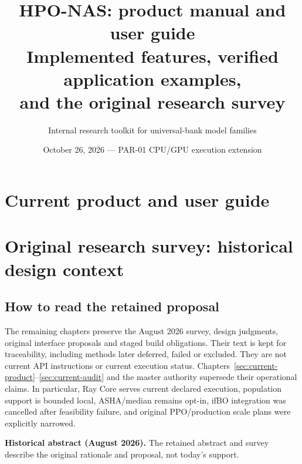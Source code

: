 \documentclass[11pt]{report}
\title{HPO-NAS: product manual and user guide\\
Implemented features, verified application examples,\\
and the original research survey}
\author{Internal research toolkit for universal-bank model families}
\date{October 26, 2026 --- PAR-01 CPU/GPU execution extension}
\newenvironment{decisions}{%
  \def\FrameCommand{{\color{blue!50!black}\vrule width 2.5pt}\hspace{8pt}}%
  \MakeFramed{\advance\hsize-\width\FrameRestore}\small}%
{\endMakeFramed}
\begin{document}
\maketitle

\begin{abstract}

\end{abstract}

\setcounter{tocdepth}{1}
\tableofcontents
\clearpage

\part{Current product and user guide}








\clearpage
\sloppy
\addtolength{\textheight}{5pt}
\part{Original research survey: historical design context}
\chapter*{How to read the retained proposal}
The remaining chapters preserve the August 2026 survey, design judgments,
original interface proposals and staged build obligations. Their text is kept
for traceability, including methods later deferred, failed or excluded.
They are not current API instructions or current execution status.
Chapters~\ref{sec:current-product}--\ref{sec:current-audit} and the master
authority supersede their operational claims. In particular, Ray Core serves
current declared execution, population support is bounded local, ASHA/median
remains opt-in, ifBO integration was cancelled after feasibility failure, and
original PPO/production scale plans were explicitly narrowed.

\begin{decisions}
\textbf{Historical abstract (August 2026).} The retained abstract and survey
describe the original rationale and proposal, not today's support.
\end{decisions}

\clearpage


\end{document}

